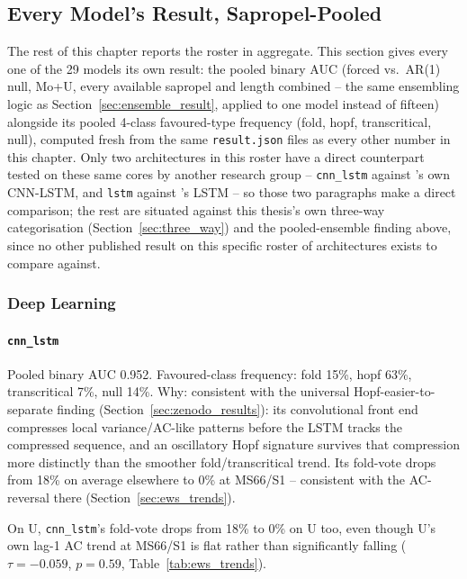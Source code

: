 \subsection{Every Model's Result, Sapropel-Pooled}
\label{sec:per_model_type}

The rest of this chapter reports the roster in aggregate. This section gives every one of the 29 models its own result: the pooled binary AUC (forced vs.\ AR(1) null, Mo+U, every available sapropel and length combined -- the same ensembling logic as Section~\ref{sec:ensemble_result}, applied to one model instead of fifteen) alongside its pooled 4-class favoured-type frequency (fold, hopf, transcritical, null), computed fresh from the same \texttt{result.json} files as every other number in this chapter. Only two architectures in this roster have a direct counterpart tested on these same cores by another research group -- \texttt{cnn\_lstm} against \citet{bury2021}'s own CNN-LSTM, and \texttt{lstm} against \citet{ma2025sdml}'s LSTM -- so those two paragraphs make a direct comparison; the rest are situated against this thesis's own three-way categorisation (Section~\ref{sec:three_way}) and the pooled-ensemble finding above, since no other published result on this specific roster of architectures exists to compare against.

\subsubsection{Deep Learning}
\paragraph{\texttt{cnn\_lstm}} Pooled binary AUC 0.952. Favoured-class frequency: fold 15\%, hopf 63\%, transcritical 7\%, null 14\%. Why: consistent with the universal Hopf-easier-to-separate finding (Section~\ref{sec:zenodo_results}): its convolutional front end compresses local variance/AC-like patterns before the LSTM tracks the compressed sequence, and an oscillatory Hopf signature survives that compression more distinctly than the smoother fold/transcritical trend. Its fold-vote drops from 18\% on average elsewhere to 0\% at MS66/S1 -- consistent with the AC-reversal there (Section~\ref{sec:ews_trends}).

On U, \texttt{cnn\_lstm}'s fold-vote drops from 18\% to 0\% on U too, even though U's own lag-1 AC trend at MS66/S1 is flat rather than significantly falling ($\tau=-0.059$, $p=0.59$, Table~\ref{tab:ews_trends}).

